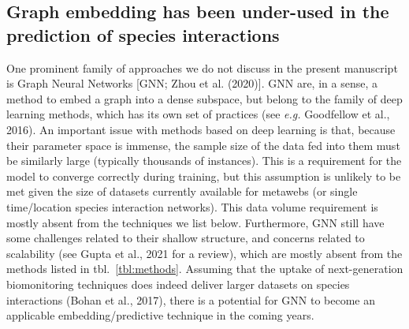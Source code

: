 \documentclass[11pt]{article}
\begin{document}
\hypertarget{graph-embedding-has-been-under-used-in-the-prediction-of-species-interactions}{%
\subsection{Graph embedding has been under-used in the prediction of
species
interactions}\label{graph-embedding-has-been-under-used-in-the-prediction-of-species-interactions}}

One prominent family of approaches we do not discuss in the present
manuscript is Graph Neural Networks {[}GNN; Zhou et al. (2020){]}. GNN
are, in a sense, a method to embed a graph into a dense subspace, but
belong to the family of deep learning methods, which has its own set of
practices (see \emph{e.g.} Goodfellow et al., 2016). An important issue
with methods based on deep learning is that, because their parameter
space is immense, the sample size of the data fed into them must be
similarly large (typically thousands of instances). This is a
requirement for the model to converge correctly during training, but
this assumption is unlikely to be met given the size of datasets
currently available for metawebs (or single time/location species
interaction networks). This data volume requirement is mostly absent
from the techniques we list below. Furthermore, GNN still have some
challenges related to their shallow structure, and concerns related to
scalability (see Gupta et al., 2021 for a review), which are mostly
absent from the methods listed in tbl.~\ref{tbl:methods}. Assuming that
the uptake of next-generation biomonitoring techniques does indeed
deliver larger datasets on species interactions (Bohan et al., 2017),
there is a potential for GNN to become an applicable
embedding/predictive technique in the coming years.
\end{document}
